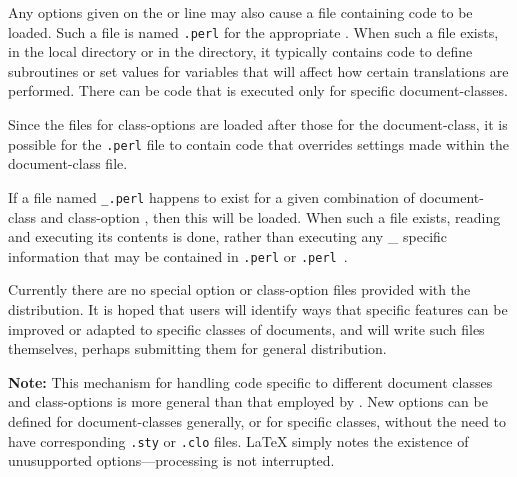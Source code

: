 Any options given on the  or  line
may also cause a file containing \Perl{} code to be loaded. 
Such a file is named \texttt{.perl} for the appropriate .
When such a file exists, in the local directory or in the  directory,
it typically contains \Perl{} code to define subroutines or set values for variables 
that will affect how certain translations are performed.
There can be code that is executed only for specific document-classes.

Since the files for class-options are loaded after those for the document-class,
it is possible for the \texttt{.perl} file to contain code that overrides
settings made within the document-class file.

\medskip{}%
If a file named \texttt{\_.perl} happens to exist for
a given combination of document-class  and class-option ,
then this will be loaded. 
When such a file exists, reading and executing its contents is done,
rather than executing any \_ specific information
that may be contained in  \texttt{.perl} or \texttt{.perl}~.

\medskip
Currently there are no special option or class-option files provided with 
the \latextohtml{} distribution. It is hoped that users will identify ways 
that specific features can be improved or adapted to specific classes of documents, 
and will write such files themselves, perhaps submitting them for general distribution.

\bigskip
\textbf{Note: }
This mechanism for handling code specific to different document classes
and class-options is more general than that employed by \LaTeXe.
New options can be defined for document-classes generally, or for specific classes,
without the need to have corresponding \texttt{.sty} or \texttt{.clo} files.
\LaTeX{} simply notes the existence of unusupported options---processing is not
interrupted.  



